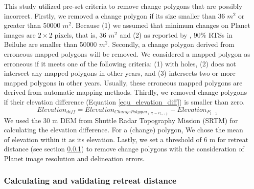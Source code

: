 \documentclass[authoryear,preprint,review,12pt]{elsarticle}
\begin{document}
This study utilized pre-set criteria to remove change polygons that are possibly incorrect. 
Firstly, we removed a change polygon if its size smaller than 36 $m^2$ or greater than 50000 $m^2$. 
Because (1) we assumed that minimum changes on Planet images are $2\times2$ pixels, that is, 36 $m^2$ and (2) as reported by \cite{huang2020using}, 90\% RTSs in Beiluhe are smaller than 50000 $m^2$. 
Secondly, a change polygon derived from erroneous mapped polygons will be removed.
We considered a mapped polygon as erroneous if it meets one of the following criteria: (1) with holes, (2) does not intersect any mapped polygons in other years, and (3) intersects two or more mapped polygons in other years.
Usually, these erroneous mapped polygons are derived from automatic mapping methods. 
Thirdly, we removed change polygons if their elevation difference (Equation \ref{equ_elevation_diff}) is smaller than zero. 
\begin{equation}
Elevation_{diff}=Elevation_{ChangePolygon_{(P_{t}-P_{t-1})}} -  Elevation_{P_{t-1}}
\label{equ_elevation_diff}
\end{equation}
We used the 30 m DEM from Shuttle Radar Topography Mission (SRTM) \citep{farr2007shuttle} for calculating the elevation difference. 
For a (change) polygon, We chose the mean of elevation within it as its elevation. 
Lastly, we set a threshold of 6 m for retreat distance (see section \ref{sec_cal_retreat_dis}) to remove change polygons with the consideration of Planet image resolution and delineation errors. 


\subsubsection{Calculating and validating retreat distance}
\label{sec_cal_retreat_dis}
\end{document}
